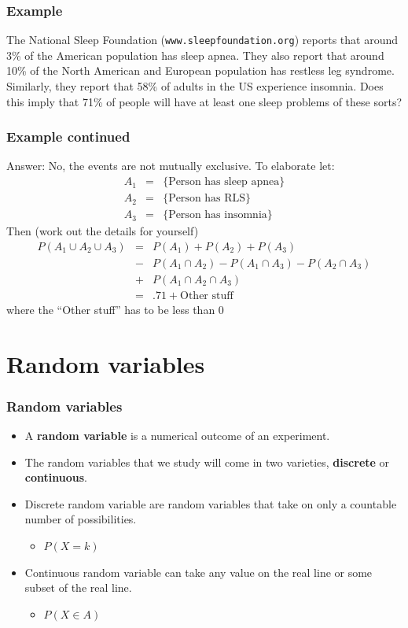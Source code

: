 \documentclass[aspectratio=169]{beamer}
\begin{document}
\begin{frame}
\frametitle{Example} 
  The National Sleep Foundation (\texttt{www.sleepfoundation.org})
  reports that around 3\% of the American population has sleep
  apnea.  They also report that around 10\% of the North American
  and European population has restless leg syndrome. Similarly, they
  report that 58\% of adults in the US experience insomnia.  Does
  this imply that 71\% of people will have at least one sleep
  problems of these sorts?
\end{frame}

\begin{frame} \frametitle{Example continued}
  Answer: No, the events are not mutually exclusive. To elaborate let:
  \begin{eqnarray*}
    A_1 & = & \{\mbox{Person has sleep apnea}\} \\
    A_2 & = & \{\mbox{Person has RLS}\} \\
    A_3 & = & \{\mbox{Person has insomnia}\}
  \end{eqnarray*}
  Then (work out the details for yourself)
  \begin{eqnarray*}
    P(A_1 \cup A_2 \cup A_3) & = & P(A_1) + P(A_2) + P(A_3) \\
   & - & P(A_1 \cap A_2) - P(A_1 \cap A_3) - P(A_2 \cap A_3) \\
   & + & P(A_1 \cap A_2 \cap A_3) \\
   & = & .71 + \mbox{Other stuff}
  \end{eqnarray*}
where the ``Other stuff'' has to be less than $0$
\end{frame}


\section{Random variables}
\begin{frame}
\frametitle{Random variables}
\begin{itemize}
\item A {\bf random variable} is a numerical outcome of an experiment.
\item The random variables that we study will come in two varieties,
  {\bf discrete} or {\bf continuous}.
\item Discrete random variable are random variables that take on only a
countable number of possibilities.
\begin{itemize}{}
\item $P(X = k)$
\end{itemize}
\item Continuous random variable can take any value on the real line or some
subset of the real line.
\begin{itemize}{}
\item $P(X \in A)$
\end{itemize}
\end{itemize}
\end{frame}
\end{document}
